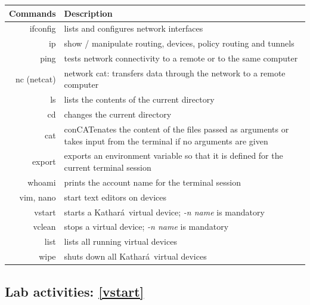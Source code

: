 \documentclass[12pt]{book}
\newcommand{\kathara}{Kathar\'a}
\begin{document}
\begin{tabularx}{\textwidth}{r  X}
  Commands & Description \\ \midrule
  ifconfig & lists and configures network interfaces \\
  ip & show / manipulate routing, devices, policy routing and tunnels \\
  ping & tests network connectivity to a remote or to the same computer \\
  nc (netcat) & network cat: transfers data through the network to a remote computer \\ \midrule

  ls & lists the contents of the current directory \\
  cd & changes the current directory \\
  cat & conCATenates the content of the files passed as arguments or takes input from the terminal if no arguments are given \\
  export & exports an environment variable so that it is defined for the current terminal session \\
  whoami & prints the account name for the terminal session\\
  vim, nano & start text editors on devices \\ \midrule
  vstart & starts a \kathara\ virtual device; \emph{-n name} is mandatory \\
  vclean & stops a virtual device;  \emph{-n name} is mandatory \\
  list & lists all running virtual devices \\
  wipe & shuts down all \kathara\ virtual devices\\
\end{tabularx}



\subsection{Lab activities: \ref{vstart}}
\end{document}
